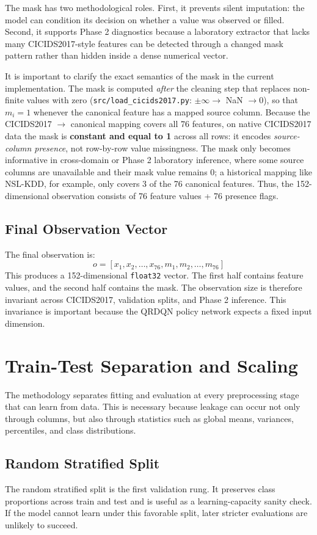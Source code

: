 The mask has two methodological roles. First, it prevents silent imputation: the model can condition its decision on whether a value was observed or filled. Second, it supports Phase 2 diagnostics because a laboratory extractor that lacks many CICIDS2017-style features can be detected through a changed mask pattern rather than hidden inside a dense numerical vector.

It is important to clarify the exact semantics of the mask in the current implementation. The mask is computed \emph{after} the cleaning step that replaces non-finite values with zero (\texttt{src/load\_cicids2017.py}: $\pm\infty \to$ NaN $\to 0$), so that $m_i = 1$ whenever the canonical feature has a mapped source column. Because the CICIDS2017 $\to$ canonical mapping covers all 76 features, on native CICIDS2017 data the mask is \textbf{constant and equal to 1} across all rows: it encodes \emph{source-column presence}, not row-by-row value missingness. The mask only becomes informative in cross-domain or Phase 2 laboratory inference, where some source columns are unavailable and their mask value remains 0; a historical mapping like NSL-KDD, for example, only covers 3 of the 76 canonical features. Thus, the 152-dimensional observation consists of 76 feature values + 76 presence flags.

\subsection{Final Observation Vector}
The final observation is:
\[
    o = [x_1, x_2, \dots, x_{76}, m_1, m_2, \dots, m_{76}]
\]
This produces a 152-dimensional \texttt{float32} vector. The first half contains feature values, and the second half contains the mask. The observation size is therefore invariant across CICIDS2017, validation splits, and Phase 2 inference. This invariance is important because the QRDQN policy network expects a fixed input dimension.

\section{Train-Test Separation and Scaling}
The methodology separates fitting and evaluation at every preprocessing stage that can learn from data. This is necessary because leakage can occur not only through columns, but also through statistics such as global means, variances, percentiles, and class distributions.

\subsection{Random Stratified Split}
The random stratified split is the first validation rung. It preserves class proportions across train and test and is useful as a learning-capacity sanity check. If the model cannot learn under this favorable split, later stricter evaluations are unlikely to succeed.

